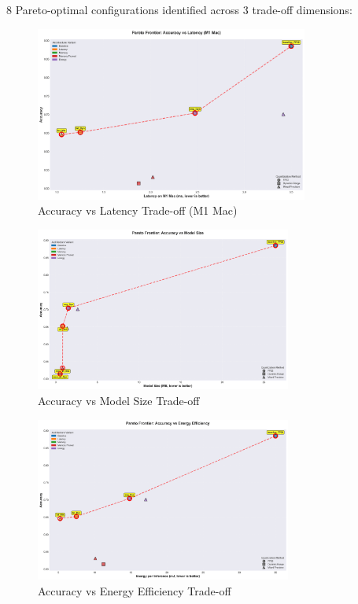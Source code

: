 \documentclass[10pt, a4paper]{article}
\begin{document}
8 Pareto-optimal configurations identified across 3 trade-off dimensions:

\begin{figure}[H]
\centering
\includegraphics[width=0.8\textwidth]{charts/part4_pareto_latency.png}
\caption{Accuracy vs Latency Trade-off (M1 Mac)}
\end{figure}

\begin{figure}[H]
\centering
\includegraphics[width=0.75\textwidth]{charts/part4_pareto_memory.png}
\caption{Accuracy vs Model Size Trade-off}
\end{figure}

\begin{figure}[H]
\centering
\includegraphics[width=0.75\textwidth]{charts/part4_pareto_energy.png}
\caption{Accuracy vs Energy Efficiency Trade-off}
\end{figure}
\end{document}
